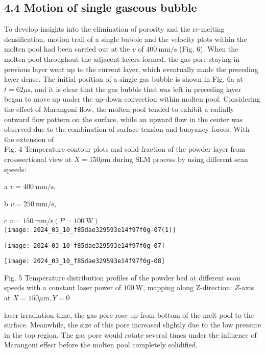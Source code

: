 \documentclass[10pt]{article}
\begin{document}
\subsection*{4.4 Motion of single gaseous bubble}
To develop insights into the elimination of porosity and the re-melting densification, motion trail of a single bubble and the velocity plots within the molten pool had been carried out at the $v$ of $400 \mathrm{~mm} / \mathrm{s}$ (Fig. 6). When the molten pool throughout the adjacent layers formed, the gas pore staying in previous layer went up to the current layer, which eventually made the preceding layer dense. The initial position of a single gas bubble is shown in Fig. 6a at $t=62 \mu \mathrm{s}$, and it is clear that the gas bubble that was left in preceding layer began to move up under the up-down convection within molten pool. Considering the effect of Marangoni flow, the molten pool tended to exhibit a radially outward flow pattern on the surface, while an upward flow in the center was observed due to the combination of surface tension and buoyancy forces. With the extension of\\
Fig. 4 Temperature contour plots and solid fraction of the powder layer from crosssectional view at $X=150 \mu \mathrm{m}$ during SLM process by using different scan speeds:

a $v=400 \mathrm{~mm} / \mathrm{s}$,

b $v=250 \mathrm{~mm} / \mathrm{s}$,

c $v=150 \mathrm{~mm} / \mathrm{s}(P=100 \mathrm{~W})$\\
\texttt{[image: 2024\_03\_10\_f85dae329593e14f97f0g-07(1)]}

\begin{center}
\texttt{[image: 2024\_03\_10\_f85dae329593e14f97f0g-07]}
\end{center}

\begin{center}
\texttt{[image: 2024\_03\_10\_f85dae329593e14f97f0g-08]}
\end{center}

Fig. 5 Temperature distribution profiles of the powder bed at different scan speeds with a constant laser power of $100 \mathrm{~W}$, mapping along Z-direction: $Z$-axis at $X=150 \mu \mathrm{m}, Y=0$

laser irradiation time, the gas pore rose up from bottom of the melt pool to the surface. Meanwhile, the size of this pore increased slightly due to the low pressure in the top region. The gas pore would rotate several times under the influence of Marangoni effect before the molten pool completely solidified.
\end{document}
